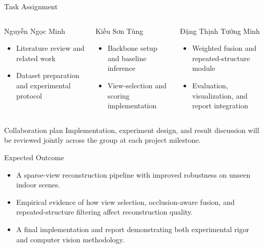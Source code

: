 \documentclass[aspectratio=169,11pt]{beamer}
\begin{document}
\begin{frame}{Task Assignment}
\begin{columns}[T,totalwidth=\textwidth]
\begin{block}{Nguyễn Ngọc Minh}
\begin{itemize}
    \item Literature review and related work
    \item Dataset preparation and experimental protocol
\end{itemize}
\end{block}

\begin{block}{Kiều Sơn Tùng}
\begin{itemize}
    \item Backbone setup and baseline inference
    \item View-selection and scoring implementation
\end{itemize}
\end{block}

\begin{block}{Đặng Thịnh Tường Minh}
\begin{itemize}
    \item Weighted fusion and repeated-structure module
    \item Evaluation, visualization, and report integration
\end{itemize}
\end{block}
\end{columns}

\vspace{0.3em}
\begin{block}{Collaboration plan}
Implementation, experiment design, and result discussion will be reviewed jointly across the group at each project milestone.
\end{block}
\end{frame}

\begin{frame}{Expected Outcome}
\begin{itemize}
    \item A sparse-view reconstruction pipeline with improved robustness on unseen indoor scenes.
    \item Empirical evidence of how view selection, occlusion-aware fusion, and repeated-structure filtering affect reconstruction quality.
    \item A final implementation and report demonstrating both experimental rigor and computer vision methodology.
\end{itemize}
\end{frame}
\end{document}
